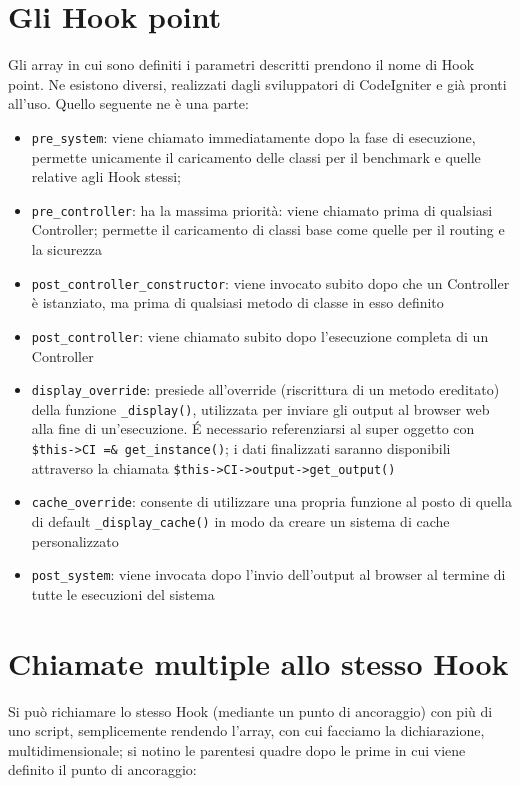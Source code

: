 \section*{Gli Hook point}
Gli array in cui sono definiti i parametri descritti prendono il nome di Hook point. Ne esistono diversi, realizzati dagli sviluppatori di CodeIgniter e già pronti all'uso. Quello seguente ne è una parte:

\begin{itemize}
\item \verb|pre_system|: viene chiamato immediatamente dopo la fase di esecuzione, permette unicamente il caricamento delle classi per il benchmark e quelle relative agli Hook stessi;
\item \verb|pre_controller|: ha la massima priorità: viene chiamato prima di qualsiasi Controller; permette il caricamento di classi base come quelle per il routing e la sicurezza
\item \verb|post_controller_constructor|: viene invocato subito dopo che un Controller è istanziato, ma prima di qualsiasi metodo di classe in esso definito
\item \verb|post_controller|: viene chiamato subito dopo l'esecuzione completa di un Controller
\item \verb|display_override|: presiede all'override (riscrittura di un metodo ereditato) della funzione \verb|_display()|, utilizzata per inviare gli output al browser web alla fine di un'esecuzione. \'E necessario referenziarsi al super oggetto con \verb|$this->CI =& get_instance()|; i dati finalizzati saranno disponibili attraverso la chiamata \verb|$this->CI->output->get_output()|
\item \verb|cache_override|: consente di utilizzare una propria funzione al posto di quella di default \verb|_display_cache()| in modo da creare un sistema di cache personalizzato
\item \verb|post_system|: viene invocata dopo l'invio dell'output al browser al termine di tutte le esecuzioni del sistema
\end{itemize} 

\section*{Chiamate multiple allo stesso Hook}
Si può richiamare lo stesso Hook (mediante un punto di ancoraggio) con più di uno script, semplicemente rendendo l'array, con cui facciamo la dichiarazione, multidimensionale; si notino le parentesi quadre dopo le prime in cui viene definito il punto di ancoraggio:

